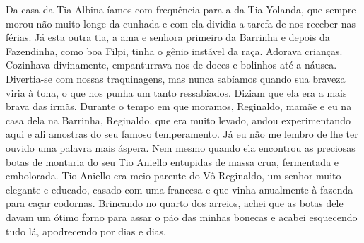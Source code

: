 Da casa da Tia Albina íamos com frequência para a da Tia Yolanda, que sempre morou não muito longe da cunhada e com ela dividia a tarefa de nos receber nas férias.
Já esta outra tia, a ama e senhora primeiro da Barrinha e depois da Fazendinha, como boa Filpi, tinha o gênio instável da raça.
Adorava crianças.
Cozinhava divinamente, empanturrava-nos de doces e bolinhos até a náusea.
Divertia-se com nossas traquinagens, mas nunca sabíamos quando sua braveza viria à tona, o que nos punha um tanto ressabiados.
Diziam que ela era a mais brava das irmãs.
Durante o tempo em que moramos, Reginaldo, mamãe e eu na casa dela na Barrinha, Reginaldo, que era muito levado, andou experimentando aqui e ali amostras do seu famoso temperamento.
Já eu não me lembro de lhe ter ouvido uma palavra mais áspera.
Nem mesmo quando ela encontrou as preciosas botas de montaria do seu Tio Aniello entupidas de massa crua, fermentada e embolorada.
Tio Aniello era meio parente do Vô Reginaldo, um senhor muito elegante e educado, casado com uma francesa e que vinha anualmente à fazenda para caçar codornas.
Brincando no quarto dos arreios, achei que as botas dele davam um ótimo forno para assar o pão das minhas bonecas e acabei esquecendo tudo lá, apodrecendo por dias e dias.


